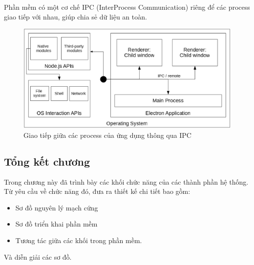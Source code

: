 Phần mềm có một cơ chế IPC (InterProcess Communication) riêng để các process giao tiếp với nhau, giúp chia sẻ dữ liệu an toàn.
\begin{figure}[!ht]
     \centering
    \includegraphics[width=0.8\linewidth]{Figures/Electron_IPC_mechanism.jpg}
    \caption{Giao tiếp giữa các process của ứng dụng thông qua IPC}
    \label{fig:Electron_IPC_mechanism}
\end{figure}

\FloatBarrier
\subsection{Tổng kết chương}

Trong chương này đã trình bày các khối chức năng của các thành phần hệ thống. Từ yêu cầu về chức năng đó, đưa ra thiết kế chi tiết bao gồm:

\begin{itemize}
    \item Sơ đồ nguyên lý mạch cứng 
    \item Sơ đồ triển khai phần mềm
    \item Tương tác giữa các khối trong phần mềm.
\end{itemize}

Và diễn giải các sơ đồ.


















